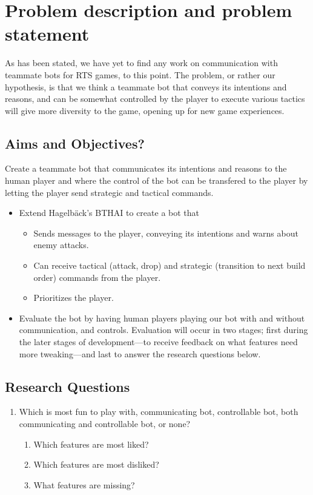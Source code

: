 \chapter{Problem description and problem statement}
As has been stated, we have yet to find any work on communication with teammate bots for RTS games, to this point. The problem, or rather our hypothesis, is that we think a teammate bot that conveys its intentions and reasons, and can be somewhat controlled by the player to execute various tactics will give more diversity to the game, opening up for new game experiences.

\section{Aims and Objectives?}
Create a teammate bot that communicates its intentions and reasons to the human player and where the control of the bot can be transfered to the player by letting the player send strategic and tactical commands.
\begin{itemize}
	\item Extend Hagelbäck's BTHAI\cite{bthai} to create a bot that
	\begin{itemize}
		\item Sends messages to the player, conveying its intentions and warns about enemy attacks.
		\item Can receive tactical (attack, drop) and strategic (transition to next build order) commands from the player.
		\item Prioritizes the player. 
	\end{itemize}
	\item Evaluate the bot by having human players playing our bot with and without communication, and controls. Evaluation will occur in two stages; first during the later stages of development—to receive feedback on what features need more tweaking—and last to answer the research questions below.
\end{itemize}

\section{Research Questions}
\renewcommand{\theenumii}{\arabic{enumi}.\arabic{enumii}}
\renewcommand{\labelenumii}{\theenumii.}
\begin{enumerate}
	\item	Which is most fun to play with, communicating bot, controllable bot, both communicating and controllable bot, or none?
	\begin{enumerate}
		\item Which features are most liked?
		\item Which features are most disliked?
		\item What features are missing?
	\end{enumerate}
\end{enumerate}

